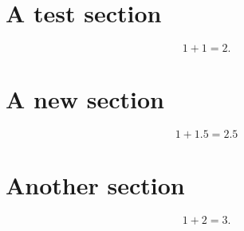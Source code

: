 \documentclass{article}
\begin{document}
\section{A test section}
\begin{equation}
1+1=2.
\end{equation}
\section{A new section}
\begin{equation}
1+1.5=2.5
\end{equation}
\section{Another section}
\begin{equation}
1+2=3.
\end{equation}
\end{document}
